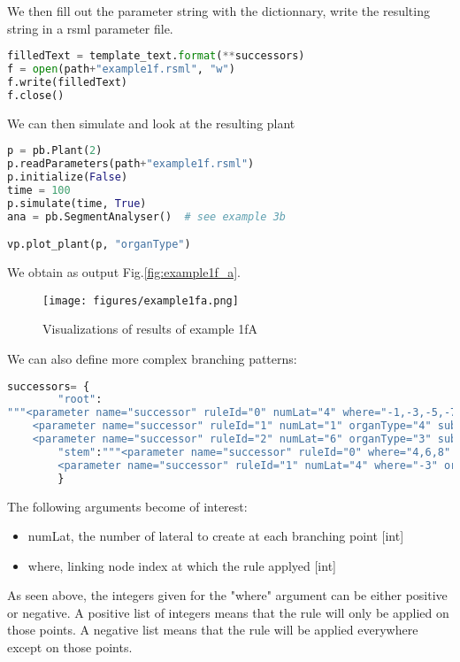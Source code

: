 We then fill out the parameter string with the dictionnary, write the resulting string in a rsml parameter file.
\begin{lstlisting}[language=Python]
filledText = template_text.format(**successors)
f = open(path+"example1f.rsml", "w")
f.write(filledText)
f.close()
\end{lstlisting}

We can then simulate and look at the resulting plant
\begin{lstlisting}[language=Python]
p = pb.Plant(2)
p.readParameters(path+"example1f.rsml")  
p.initialize(False)
time = 100
p.simulate(time, True)
ana = pb.SegmentAnalyser()  # see example 3b

vp.plot_plant(p, "organType")
\end{lstlisting}

We obtain as output  Fig.\ref{fig:example1f_a}.

\begin{figure}
\texttt{[image: figures/example1fa.png]}
\caption{Visualizations of results of example 1fA} 
\end{figure}

We can also define more complex branching patterns:
\begin{lstlisting}[language=Python]
successors= {
        "root":
"""<parameter name="successor" ruleId="0" numLat="4" where="-1,-3,-5,-7" organType="2" subtype="2" probability="1"/>
    <parameter name="successor" ruleId="1" numLat="1" organType="4" subtype="1" probability="1"/>
    <parameter name="successor" ruleId="2" numLat="6" organType="3" subtype="2" probability="1"/>""",
        "stem":"""<parameter name="successor" ruleId="0" where="4,6,8" organType="2" subtype="1" probability="1"/>
        <parameter name="successor" ruleId="1" numLat="4" where="-3" organType="4" subtype="1" probability="1"/>"""
        }
\end{lstlisting}
The following arguments become of interest:
\begin{itemize}
 \item numLat, the number of lateral to create at each branching point [int]
 \item where, linking node index at which the rule applyed [int]
\end{itemize}
As seen above, the integers given for the "where" argument can be either positive or negative. A positive list of integers means that the rule will only be applied on those points. A negative list means that the rule will be applied everywhere except on those points.

